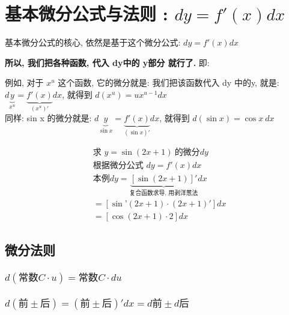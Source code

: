 \documentclass[UTF8]{ctexart}
\begin{document}
	
	
	
\section{基本微分公式与法则 : $dy = f'(x) dx$}
	
基本微分公式的核心, 依然是基于这个微分公式: $dy = f'(x) dx$

\textbf{所以, 我们把各种函数, 代入 dy中的 y部分 就行了.} 即:

例如, 对于 $x^u$ 这个函数, 它的微分就是: 我们把该函数代入 dy 中的y, 就是: $d\underset{x^u}{\underbrace{y}}=\underset{\left( x^u \right) '}{\underbrace{f'\left( x \right) }}dx$, 就得到 $d\left( x^u \right) =ux^{u-1}dx$ \\
	
同样: sin x 的微分就是: $d\underset{\sin x}{\underbrace{y}}=\underset{\left( \sin x \right) '}{\underbrace{f'\left( x \right) }}dx$, 就得到 $d\left( \sin x \right) =\cos x\ dx$ \\

\begin{myEnvSample}
	\begin{align*}
	&\text{求\ }y=\sin \left( 2x+1 \right) \ \text{的微分}dy\\
&\text{根据微分公式\ }dy=f'\left( x \right) dx\\
&\text{本例}dy=\underset{\text{复合函数求导,\ 用剥洋葱法}}{\underbrace{\left[ \sin \left( 2x+1 \right) \right] '}}dx\\
&=\left[ \sin\text{'}\left( 2x+1 \right) \cdot \left( 2x+1 \right) ' \right] dx\\
&=\left[ \cos \left( 2x+1 \right) \cdot 2 \right] dx
	\end{align*}
\end{myEnvSample}




\subsection{微分法则}
	
	\subsubsection{$d\left( \text{常数}C\cdot u \right) =\text{常数}C\cdot du$}
	
		
	\subsubsection{$d\left( \text{前}\pm \text{后} \right) =\left( \text{前}\pm \text{后} \right) 'dx=d\text{前}\pm d\text{后}	$}
	
\end{document}
